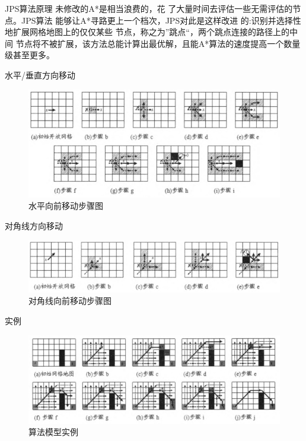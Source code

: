 \documentclass[notheorems, aspectratio=54]{beamer}
\begin{document}
\begin{frame}{JPS算法原理}
    未修改的A*是相当浪费的，花 了大量时间去评估一些无需评估的节点。JPS算法 能够让A*寻路更上一个档次，JPS对此是这样改进 的:识别并选择性地扩展网格地图上的仅仅某些 节点，称之为”跳点“，两个跳点连接的路径上的中间 节点将不被扩展，该方法总能计算出最优解，且能A*算法的速度提高一个数量级甚至更多。
\end{frame}

\begin{frame}{水平/垂直方向移动}
    \begin{figure}[htbp]
		\centering
		\includegraphics[scale=0.6]{figure7.png}
		\caption{水平向前移动步骤图}
		\label{figure 7}
	\end{figure}
\end{frame}

\begin{frame}{对角线方向移动}
    \begin{figure}[htbp]
		\centering
		\includegraphics[scale=0.6]{figure8.png}
		\caption{对角线向前移动步骤图}
		\label{figure 8}
	\end{figure}
\end{frame}

\begin{frame}{实例}
    \begin{figure}[htbp]
		\centering
		\includegraphics[scale=0.6]{figure9.png}
		\caption{算法模型实例}
		\label{figure 9}
	\end{figure}
\end{frame}
\end{document}
